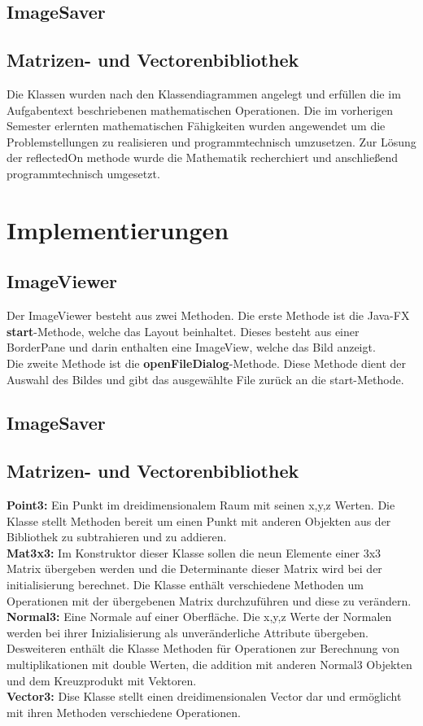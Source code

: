 \documentclass[14pt]{extarticle}
\begin{document}
\subsection{ImageSaver}

\subsection{Matrizen- und Vectorenbibliothek}
Die Klassen wurden nach den Klassendiagrammen angelegt und erfüllen die im Aufgabentext beschriebenen mathematischen Operationen. Die im vorherigen Semester erlernten mathematischen Fähigkeiten  wurden angewendet um die Problemstellungen zu realisieren und programmtechnisch umzusetzen. Zur Lösung der reflectedOn methode wurde die Mathematik recherchiert und anschließend programmtechnisch umgesetzt.

\section{Implementierungen}
\subsection{ImageViewer}
Der ImageViewer besteht aus zwei Methoden. Die erste Methode ist die Java-FX \textbf{start}-Methode, welche das Layout beinhaltet. Dieses besteht aus einer BorderPane und darin enthalten eine ImageView, welche das Bild anzeigt. \\
Die zweite Methode ist die \textbf{openFileDialog}-Methode. Diese Methode dient der Auswahl des Bildes und gibt das ausgewählte File zurück an die start-Methode.
\subsection{ImageSaver}

\subsection{Matrizen- und Vectorenbibliothek}
\textbf{Point3:} Ein Punkt im dreidimensionalem Raum mit seinen x,y,z Werten. Die Klasse stellt Methoden bereit um einen Punkt mit anderen Objekten aus der Bibliothek zu subtrahieren und zu addieren.
\\\textbf{Mat3x3:} Im Konstruktor dieser Klasse sollen die neun Elemente einer 3x3 Matrix übergeben werden und die Determinante dieser Matrix wird bei der initialisierung berechnet. Die Klasse enthält verschiedene Methoden um Operationen mit der übergebenen Matrix durchzuführen und diese zu verändern. 
\\\textbf{Normal3:} Eine Normale auf einer Oberfläche. Die x,y,z Werte der Normalen werden bei ihrer Inizialisierung als unveränderliche Attribute übergeben. Desweiteren enthält die Klasse Methoden für Operationen zur Berechnung von multiplikationen mit double Werten, die addition mit anderen Normal3 Objekten und dem Kreuzprodukt mit Vektoren.
\\\textbf{Vector3:} Dise Klasse stellt einen dreidimensionalen Vector dar und ermöglicht mit ihren Methoden verschiedene Operationen.
\end{document}
